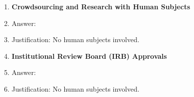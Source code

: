 \documentclass{article}
\begin{document}
\begin{enumerate}
\item {\bf Crowdsourcing and Research with Human Subjects}
    \item[] Answer: \answerNA{}
    \item[] Justification: No human subjects involved.

\item {\bf Institutional Review Board (IRB) Approvals}
    \item[] Answer: \answerNA{}
    \item[] Justification: No human subjects involved.

\end{enumerate}
\end{document}
